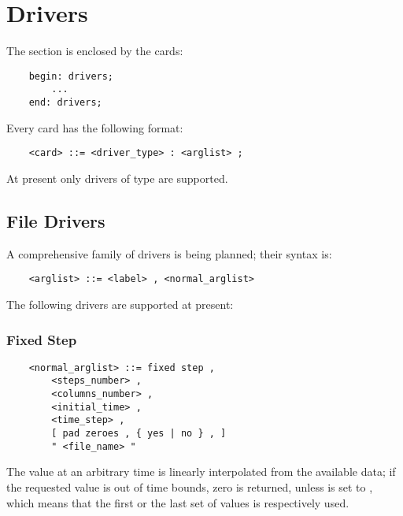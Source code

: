 %
%
%
%
%
% 
%
%

\chapter{Drivers}\label{sec:DRIVERS}
The  section is enclosed by the cards:
\begin{verbatim}
    begin: drivers;
        ...
    end: drivers;
\end{verbatim}
Every  card has the following format:
\begin{verbatim}
    <card> ::= <driver_type> : <arglist> ;
\end{verbatim}
At present only  drivers of type  are supported.

\section{File Drivers}
A comprehensive family of  drivers is being planned;
their syntax is:
\begin{verbatim}
    <arglist> ::= <label> , <normal_arglist>
\end{verbatim}
The following  drivers are supported at present:



\subsection{Fixed Step}
\begin{verbatim}
    <normal_arglist> ::= fixed step , 
        <steps_number> ,
        <columns_number> ,
        <initial_time> ,
        <time_step> ,
        [ pad zeroes , { yes | no } , ]
        " <file_name> "
\end{verbatim}
The value at an arbitrary time is linearly interpolated from the available
data; if the requested value is out of time bounds, zero is returned,
unless  is set to , which means that the first
or the last set of values is respectively used.



